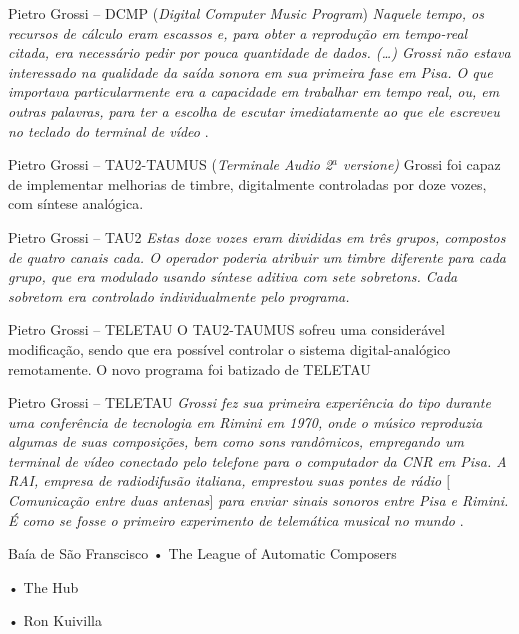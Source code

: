 \documentclass[aspectratio=169]{beamer}
\begin{document}
\begin{frame}{Pietro Grossi -- DCMP (\emph{Digital Computer Music Program})}
\emph{Naquele tempo, os recursos de cálculo eram escassos e, para obter a reprodução em tempo-real citada, era necessário pedir por pouca quantidade de dados. (\ldots) Grossi não estava interessado na qualidade da saída sonora em sua primeira fase em Pisa. O que importava particularmente era a capacidade em trabalhar em tempo real, ou, em outras palavras, para ter a escolha de escutar imediatamente ao que ele escreveu no teclado do terminal de vídeo} .
\end{frame}

\begin{frame}{Pietro Grossi -- TAU2-TAUMUS (\emph{Terminale Audio 2$^a$ versione)}}
Grossi foi capaz de implementar melhorias de timbre, digitalmente controladas por doze vozes, com síntese analógica.
\end{frame}

\begin{frame}{Pietro Grossi -- TAU2}
\emph{Estas doze vozes eram divididas em três grupos, compostos de quatro canais cada. O operador poderia atribuir um timbre diferente para cada grupo, que era modulado usando síntese aditiva com sete sobretons. Cada sobretom era controlado individualmente pelo programa.}
\end{frame}

\begin{frame}{Pietro Grossi -- TELETAU}
O TAU2-TAUMUS sofreu uma considerável modificação, sendo que era possível controlar o sistema digital-analógico remotamente. O novo programa foi batizado de TELETAU 
\end{frame}

\begin{frame}{Pietro Grossi -- TELETAU}
\emph{Grossi fez sua primeira experiência do tipo durante uma conferência de tecnologia em Rimini em 1970, onde o músico reproduzia algumas de suas composições, bem como sons randômicos, empregando um terminal de vídeo conectado pelo telefone para o computador da CNR em Pisa. A RAI, empresa de radiodifusão italiana, emprestou suas pontes de rádio $[$Comunicação entre duas antenas$]$ para enviar sinais sonoros entre Pisa e Rimini. É como se fosse o primeiro experimento de telemática musical no mundo} \cite[p.~129]{mori_pietro_2015}.
\end{frame}

\begin{frame}{Baía de São Franscisco}
• The League of Automatic Composers

• The Hub

• Ron Kuivilla
\end{frame}
\end{document}
